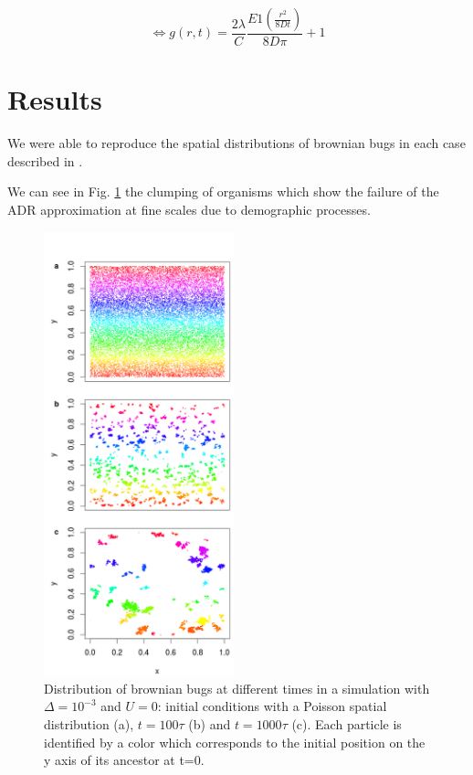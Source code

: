 \begin{equation}
\Leftrightarrow g(r,t)=\frac{2\lambda}{C}\frac{E1\left(\frac{r^{2}}{8Dt}\right)}{8D\pi}+1
\end{equation}

\section*{Results}

We were able to reproduce the spatial distributions of brownian bugs in each case described in \cite{young_reproductive_2001}.

We can see in Fig. \ref{fig:spatial_fig1} the clumping of organisms which show the failure of the ADR approximation at fine scales due to demographic processes. 

\begin{figure}[H]
\begin{center} 
 \includegraphics[width=0.49\textwidth]{../code/figure/spatial_distribution_Fig1.png}
  \caption{Distribution of brownian bugs at different times in a simulation with $\Delta=10^{-3}$ and $U=0$: initial conditions with a Poisson spatial distribution (a), $t=100\tau$ (b) and $t=1000\tau$ (c). Each particle is identified by a color which corresponds to the initial position on the y axis of its ancestor at t=0.}
  \label{fig:spatial_fig1}
\end{center}
  \end{figure}

